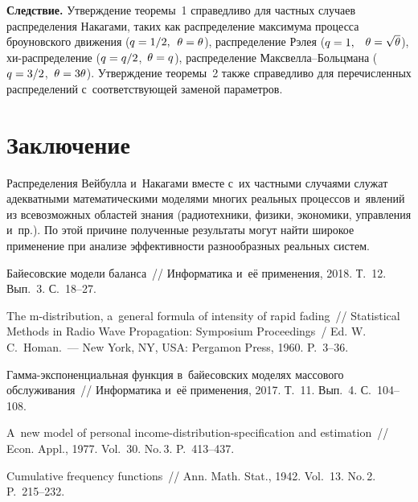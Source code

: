 \begin{multicols}{2}
\noindent
\textbf{Следствие.} Утверждение теоремы~1 справедливо для частных случаев 
распределения Накагами, таких как распределение максимума процесса броуновского 
движения ($q \hm= 1/2,$ \,$ \theta \hm= \theta$), распределение Рэлея ($q \hm= 1,$ \, 
$\theta \hm= \sqrt{\theta}$), хи-рас\-пре\-де\-ле\-ние ($q \hm= q/2$, \,$\theta \hm= q$), 
распределение Макс\-вел\-ла--Больц\-ма\-на ($q \hm= 3/2$, \,$\theta \hm= 3 \theta$). 
Утверждение теоремы~2 также справедливо для перечисленных распределений 
с~соответствующей заменой параметров.


\section{Заключение}

Распределения Вейбулла и~Накагами вместе с~их частными случаями служат 
адекватными математическими моделями многих реальных процессов и~явлений из 
всевозможных областей знания (радиотехники, физики, экономики, управления 
и~пр.). По этой причине полученные результаты могут найти широкое применение при 
анализе эффективности разнообразных реальных систем.


{\small\frenchspacing
 {%
 \begin{thebibliography}{9}
Байесовские модели баланса~// Информатика и~её применения, 2018. Т.~12. Вып.~3. С.~18--27.

The m-distribution, a~general formula of intensity of rapid fading~// 
Statistical Methods in Radio Wave Propagation: Symposium  Proceedings~/ 
Ed. W.\,C.~Homan.~--- New York, NY, USA: Pergamon Press, 1960. 
P.~3--36.

Гамма-экспоненциальная функция в~байесовских моделях массового обслуживания~// 
Информатика и~её применения, 2017. Т.~11. Вып.~4. С.~104--108.

A~new model of personal income-distribution-specification and estimation~// 
Econ. Appl., 1977. Vol.~30. No.\,3. P.~413--437.

 Cumulative frequency functions~// 
Ann. Math. Stat., 1942. Vol.~13. No.\,2. P.~215--232.
 \end{thebibliography}

 }
 }

\end{multicols}


